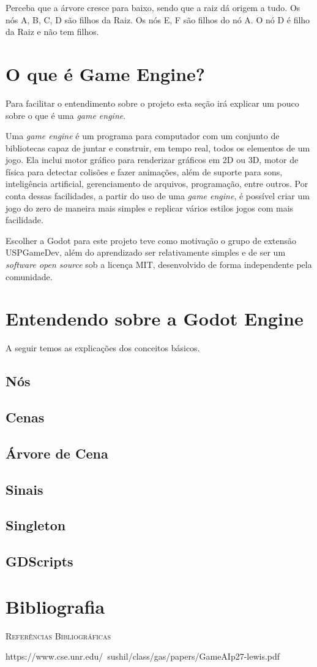 Perceba que a árvore cresce para baixo, sendo que a raiz dá origem a tudo.
Os nós A, B, C, D são filhos da Raiz. Os nós E, F são filhos do nó A. O nó
D é filho da Raiz e não tem filhos.


\section{O que é Game Engine?}

Para facilitar o entendimento sobre o projeto esta seção irá explicar um pouco
sobre o que é uma \textit{game engine}.

Uma \textit{game engine} é um programa para computador com um conjunto de 
bibliotecas capaz de juntar e construir, em tempo real, todos os elementos de um
jogo.
Ela inclui motor gráfico para renderizar gráficos em 2D ou 3D, motor de física 
para detectar colisões e fazer animações, além de suporte para sons, 
inteligência artificial, gerenciamento de arquivos, programação, entre outros.
Por conta dessas facilidades, a partir do uso de uma \textit{game engine}, é 
possível criar um jogo do zero de maneira mais simples e replicar vários estilos
jogos com mais facilidade.

Escolher a Godot para este projeto teve como motivação o grupo de extensão 
USPGameDev, além do aprendizado ser relativamente simples e de ser um 
\textit{software open source} sob a licença MIT, desenvolvido de forma 
independente pela comunidade.

\section{Entendendo sobre a Godot Engine}

A seguir temos as explicações dos conceitos básicos.

\subsection{Nós}
\subsection{Cenas}
\subsection{Árvore de Cena}
\subsection{Sinais}
\subsection{Singleton}
\subsection{GDScripts}




\section{Bibliografia}

\textsc{Referências Bibliográficas} 

https://www.cse.unr.edu/~sushil/class/gas/papers/GameAIp27-lewis.pdf